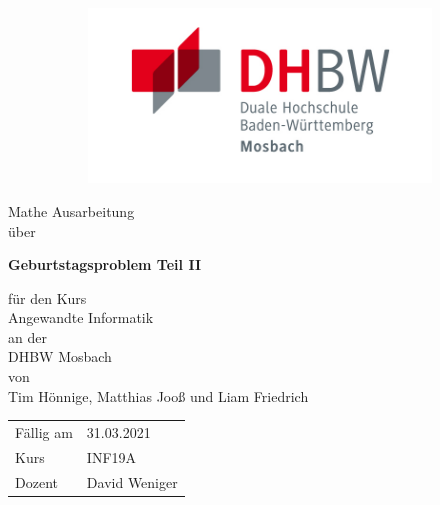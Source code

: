 
\begin{titlepage}
    \begin{figure}[!tbp]
\centering
\begin{subfigure}{.5\textwidth}

\end{subfigure}%
\begin{subfigure}{.5\textwidth}
  \centering
  \includegraphics[width=0.9\linewidth]{graphics/dhbw_mosbach.png}
  \label{fig:sub2}
\end{subfigure}
\label{fig:test}
\end{figure}
\begin{center}
\vspace*{1cm}

\LARGE
Mathe Ausarbeitung\\
\vspace{0.8cm}
\normalsize
über

\Large
\textbf{Geburtstagsproblem Teil II}\\
\vspace{0.2cm}

\normalsize
\vspace{0.7cm}
für den Kurs\\
\Large
Angewandte Informatik\\
\vspace{0.5cm}
\normalsize
an der \\
\Large
DHBW Mosbach\\

\vspace{0.7cm}
\normalsize
von\\
\Large
Tim Hönnige, Matthias Jooß und Liam Friedrich

\vfill

\vspace{0.8cm}

\begin{table}[h]
\centering
\begin{tabular}{ll}
Fällig am & 31.03.2021\\
Kurs & INF19A \\
Dozent & David Weniger
\end{tabular}
\end{table}

\end{center}
\end{titlepage}
